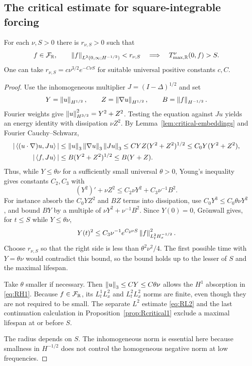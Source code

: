 \subsection{The critical estimate for square-integrable forcing}
\begin{proposition}\label{prop:Rcritical2}
For each $\nu,S>0$ there is $r_{\nu,S}>0$ such that
\[
 f\in\mathcal F_{\mathbb R},\qquad
 \left\lVert f\right\rVert_{L^2(0,\infty;H^{-1/2})}<r_{\nu,S}
 \quad\Longrightarrow\quad T^\nu_{\max,\mathbb R}(0,f)>S.
\]
One can take $r_{\nu,S}=c\nu^{3/2}e^{-C\nu S}$ for suitable universal positive constants $c,C$.
\end{proposition}
\begin{proof}
Use the inhomogeneous multiplier $J=(I-\Delta)^{1/2}$ and set
\[
 Y=\left\lVert u\right\rVert_{H^{1/2}},\qquad
 Z=\left\lVert\nabla u\right\rVert_{H^{1/2}},\qquad
 B=\left\lVert f\right\rVert_{H^{-1/2}}.
\]
Fourier weights give $\left\lVert u\right\rVert_{H^{3/2}}^2=Y^2+Z^2$. Testing the equation against $Ju$ yields an energy identity with dissipation $\nu Z^2$. By Lemma~\ref{lem:critical-embeddings} and Fourier Cauchy--Schwarz,
\begin{align*}
 |\left\langle(u\cdot\nabla)u,Ju\right\rangle|
 &\le\left\lVert u\right\rVert_3\left\lVert\nabla u\right\rVert_3\left\lVert Ju\right\rVert_3
 \le C Y Z(Y^2+Z^2)^{1/2}
 \le C_0Y(Y^2+Z^2),\\
 |\left\langle f,Ju\right\rangle|&\le B(Y^2+Z^2)^{1/2}\le B(Y+Z).
\end{align*}
Thus, while $Y\le\theta\nu$ for a sufficiently small universal $\theta>0$, Young's inequality gives constants $C_2,C_3$ with
\begin{equation}\label{eq:Rcritical2}
 (Y^2)'+\nu Z^2\le C_2\nu Y^2+C_3\nu^{-1}B^2.
\end{equation}
For instance absorb the $C_0YZ^2$ and $BZ$ terms into dissipation, use $C_0Y^3\le C_0\theta\nu Y^2$, and bound $BY$ by a multiple of $\nu Y^2+\nu^{-1}B^2$. Since $Y(0)=0$, Gr\"onwall gives, for $t\le S$ while $Y\le\theta\nu$,
\[
 Y(t)^2\le C_3\nu^{-1}e^{C_2\nu S}
            \left\lVert f\right\rVert_{L^2_tH^{-1/2}_x}^2.
\]
Choose $r_{\nu,S}$ so that the right side is less than $\theta^2\nu^2/4$. The first possible time with $Y=\theta\nu$ would contradict this bound, so the bound holds up to the lesser of $S$ and the maximal lifespan.

Take $\theta$ smaller if necessary. Then $\left\lVert u\right\rVert_3\le CY\le C\theta\nu$ allows the $H^1$ absorption in \eqref{eq:RH1}. Because $f\in\mathcal F_{\mathbb R}$, its $L^1_tL^2_x$ and $L^2_tL^2_x$ norms are finite, even though they are not required to be small. The separate $L^2$ estimate \eqref{eq:RL2} and the last continuation calculation in Proposition~\ref{prop:Rcritical1} exclude a maximal lifespan at or before $S$.

The radius depends on $S$. The inhomogeneous norm is essential here because smallness in $H^{-1/2}$ does not control the homogeneous negative norm at low frequencies.
\end{proof}

